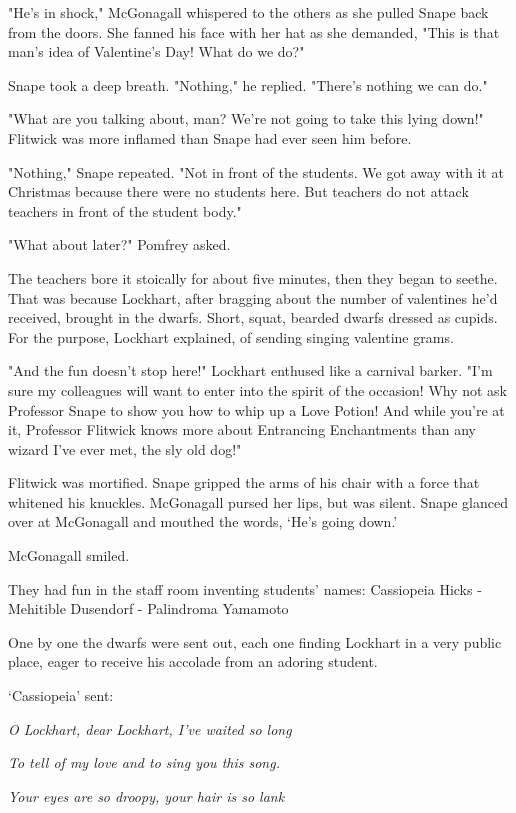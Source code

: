 "He's in shock," McGonagall whispered to the others as she pulled Snape back from the doors. She fanned his face with her hat as she demanded, "This is that man's idea of Valentine's Day! What do we do?"

Snape took a deep breath. "Nothing," he replied. "There's nothing we can do."

"What are you talking about, man? We're not going to take this lying down!" Flitwick was more inflamed than Snape had ever seen him before.

"Nothing," Snape repeated. "Not in front of the students. We got away with it at Christmas because there were no students here. But teachers do not attack teachers in front of the student body."

"What about later?" Pomfrey asked.

The teachers bore it stoically for about five minutes, then they began to seethe. That was because Lockhart, after bragging about the number of valentines he'd received, brought in the dwarfs. Short, squat, bearded dwarfs dressed as cupids. For the purpose, Lockhart explained, of sending singing valentine grams.

"And the fun doesn't stop here!" Lockhart enthused like a carnival barker. "I'm sure my colleagues will want to enter into the spirit of the occasion! Why not ask Professor Snape to show you how to whip up a Love Potion! And while you're at it, Professor Flitwick knows more about Entrancing Enchantments than any wizard I've ever met, the sly old dog!"

Flitwick was mortified. Snape gripped the arms of his chair with a force that whitened his knuckles. McGonagall pursed her lips, but was silent. Snape glanced over at McGonagall and mouthed the words, `He's going down.'

McGonagall smiled.

They had fun in the staff room inventing students' names: Cassiopeia Hicks - Mehitible Dusendorf - Palindroma Yamamoto{\el}

One by one the dwarfs were sent out, each one finding Lockhart in a very public place, eager to receive his accolade from an adoring student.

`Cassiopeia' sent:

\emph{O Lockhart, dear Lockhart, I've waited so long}

\emph{To tell of my love and to sing you this song.}

\emph{Your eyes are so droopy, your hair is so lank}

